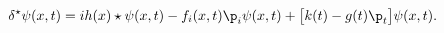 \begin{equation}
     \delta^{\star}\psi(x,t)=ih(x)\star\psi(x,t)
     -f_{i}(x,t)\p_{i}\psi(x,t)+\big[k(t)-g(t)\p_{t}\big]\psi(x,t).
     \label{ncimplem}
\end{equation}

